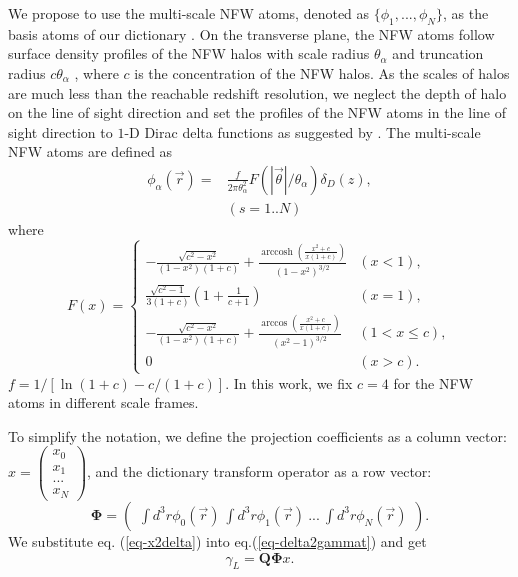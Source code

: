 \documentclass[twocolumn]{aastex62}
\DeclareMathOperator{\arccosh}{arccosh}
\begin{document}
We propose to use the multi-scale NFW atoms, denoted as $\{\phi_1,...,\phi_N\}$, as the basis atoms of our dictionary .
On the transverse plane, the NFW atoms follow surface density profiles of the NFW halos
\citep{haloModel-TJ2003-3pt} with scale radius $\theta_\alpha$ and truncation radius $c \theta_\alpha$ ,
where $c$ is the concentration of the NFW halos.
As the scales of halos are much less than the reachable redshift resolution, we neglect the depth of halo on the
line of sight direction and set the profiles of the NFW atoms in the line of sight direction to $1$-D Dirac delta
functions as suggested by \citep{LSS-massMap-Glimpse3D-Leonard2014}.
The multi-scale NFW atoms are defined as
\begin{equation}
\begin{split}
\phi_\alpha(\vec{r}) =&\frac{f }{2 \pi \theta_\alpha^2 } F(|\vec{\theta}|/\theta_\alpha) \delta_D(z),\\
&  (s=1..N)
\end{split}
\end{equation}
where
\begin{equation}
F(x)=
\begin{cases}
-\frac{\sqrt{c^2-x^2}}{(1-x^2)(1+c)} + \frac{\arccosh \left(\frac{x^2+c}{x(1+c)}\right)}{(1-x^2)^{3/2}}  & (x<1),\\
\frac{\sqrt{c^2-1}}{3(1+c)} (1+\frac{1}{c+1}) & (x=1),\\
-\frac{\sqrt{c^2-x^2}}{(1-x^2)(1+c)} + \frac{\arccos\left(\frac{x^2+c}{x(1+c)}\right)}{(x^2-1)^{3/2}} & (1<x\leq c),\\
0& (x>c).
\end{cases}
\end{equation}
$f=1/[\ln (1+c)-c/(1+c)]$. In this work, we fix $c=4$ for the NFW atoms in different scale frames.

To simplify the notation, we define the projection coefficients as a column vector:
$x=\begin{pmatrix}
x_{0}\\
x_{1}\\
...\\
x_{N}
\end{pmatrix}$,
and the dictionary transform operator as a row vector:
\begin{equation}
\mathbf{\Phi}=\begin{pmatrix}
\int d^3r\phi_0(\vec{r}) ~\int d^3r \phi_1(\vec{r})~ ...~\int d^3r \phi_{N}(\vec{r})
\end{pmatrix}.
\end{equation}
We substitute eq. (\ref{eq-x2delta}) into eq.(\ref{eq-delta2gammat}) and get
\begin{equation}\label{eq-x2gammat}
\gamma_L=\mathbf{Q}\mathbf{\Phi} x.
\end{equation}
\end{document}
